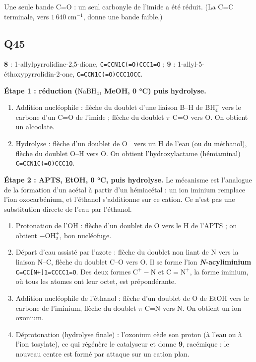 \documentclass[11pt,a4paper]{article}
\providecommand{\tightlist}{\setlength{\itemsep}{0pt}\setlength{\parskip}{0pt}}
\begin{document}
Une seule bande C=O : un seul carbonyle de l'imide a été réduit. (La C=C terminale, vers \(1\,640\ \mathrm{cm^{-1}}\), donne une bande faible.)

\hypertarget{q45}{%
\subsection{Q45}\label{q45}}

\textbf{8} : 1-\allowbreak{}allylpyrrolidine-\allowbreak{}2,5-\allowbreak{}dione, \texttt{C=\allowbreak{}CCN1C(\allowbreak{}=\allowbreak{}O)\allowbreak{}CCC1=\allowbreak{}O} ; \textbf{9} : 1-\allowbreak{}allyl-\allowbreak{}5-\allowbreak{}éthoxypyrrolidin-\allowbreak{}2-\allowbreak{}one, \texttt{C=\allowbreak{}CCN1C(\allowbreak{}=\allowbreak{}O)\allowbreak{}CCC1OCC}.

\textbf{Étape 1 : réduction (\(\mathrm{NaBH_4}\), MeOH, 0 °C) puis hydrolyse.}

\begin{enumerate}
\def\labelenumi{\arabic{enumi}.}
\tightlist
\item
  Addition nucléophile : flèche du doublet d'une liaison B--H de \(\mathrm{BH_4^-}\) vers le carbone d'un C=O de l'imide ; flèche du doublet \(\pi\) C=O vers O. On obtient un alcoolate.
\item
  Hydrolyse : flèche d'un doublet de \(\mathrm{O^-}\) vers un H de l'eau (ou du méthanol), flèche du doublet O--H vers O. On obtient l'hydroxylactame (hémiaminal) \texttt{C=CCN1C(=O)CCC1O}.
\end{enumerate}

\textbf{Étape 2 : APTS, EtOH, 0 °C, puis hydrolyse.} Le mécanisme est l'analogue de la formation d'un acétal à partir d'un hémiacétal : un ion iminium remplace l'ion oxocarbénium, et l'éthanol s'additionne sur ce cation. Ce n'est pas une substitution directe de l'eau par l'éthanol.

\begin{enumerate}
\def\labelenumi{\arabic{enumi}.}
\setcounter{enumi}{2}
\tightlist
\item
  Protonation de l'OH : flèche d'un doublet de O vers le H de l'APTS ; on obtient \(\mathrm{{-}OH_2^+}\), bon nucléofuge.
\item
  Départ d'eau assisté par l'azote : flèche du doublet non liant de N vers la liaison N--C, flèche du doublet C--O vers O. Il se forme l'ion \textbf{\emph{N}-acyliminium} \texttt{C=\allowbreak{}CC{[}N+{]}\allowbreak{}1=\allowbreak{}CCCC1=\allowbreak{}O}. Des deux formes \(\mathrm{C^+{-}N}\) et \(\mathrm{C{=}N^+}\), la forme iminium, où tous les atomes ont leur octet, est prépondérante.
\item
  Addition nucléophile de l'éthanol : flèche d'un doublet de O de EtOH vers le carbone de l'iminium, flèche du doublet \(\pi\) C=N vers N. On obtient un ion oxonium.
\item
  Déprotonation (hydrolyse finale) : l'oxonium cède son proton (à l'eau ou à l'ion tosylate), ce qui régénère le catalyseur et donne \textbf{9}, racémique : le nouveau centre est formé par attaque sur un cation plan.
\end{enumerate}
\end{document}
